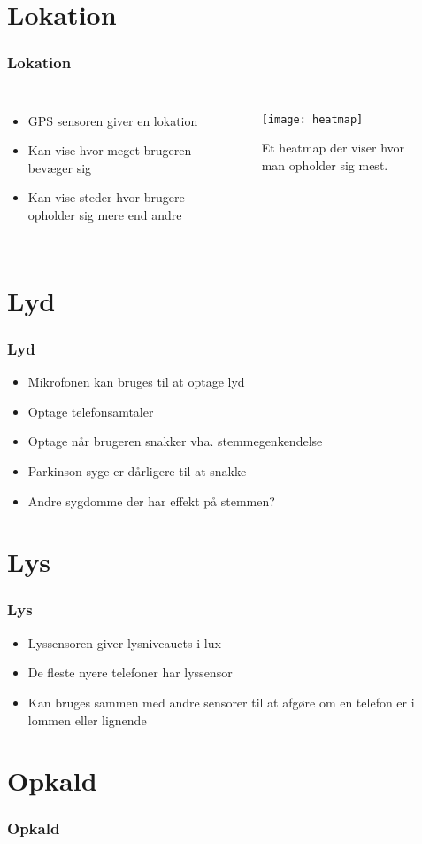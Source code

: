 \section{Lokation}
\begin{frame}[fragile]
\frametitle{Lokation}
\begin{columns}
\column[t]{5cm}
\begin{itemize}
\item GPS sensoren giver en lokation
\item Kan vise hvor meget brugeren bevæger sig
\item Kan vise steder hvor brugere opholder sig mere end andre
\end{itemize}
\column[t]{5cm}
\begin{figure}
\texttt{[image: heatmap]}
\caption{Et heatmap der viser hvor man opholder sig mest.}
\end{figure}
\end{columns}
\end{frame}



\section{Lyd}
\begin{frame}
\frametitle{Lyd}
\begin{itemize}
\item Mikrofonen kan bruges til at optage lyd
\item Optage telefonsamtaler
\item Optage når brugeren snakker vha. stemmegenkendelse
\item Parkinson syge er dårligere til at snakke
\item Andre sygdomme der har effekt på stemmen?
\end{itemize}
\end{frame}



\section{Lys}
\begin{frame}
\frametitle{Lys}
\begin{itemize}
\item Lyssensoren giver lysniveauets i lux
\item De fleste nyere telefoner har lyssensor
\item Kan bruges sammen med andre sensorer til at afgøre om en telefon er i lommen eller lignende
\end{itemize}
\end{frame}



\section{Opkald}
\begin{frame}
\frametitle{Opkald}
\end{frame}